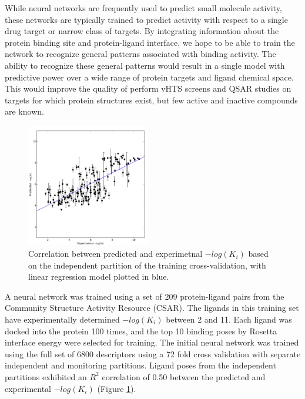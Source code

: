 \documentclass[11pt, oneside]{article}   	%
\begin{document}
While neural networks are frequently used to predict small molecule activity\citep{Hecht:2008gs, Mueller:2012gn, Gohlke:2002in}, these networks are typically trained to predict activity with respect to a single drug target or narrow class of targets.  
By integrating information about the protein binding site and protein-ligand interface, we hope to be able to train the network to recognize general patterns associated with binding activity.  
The ability to recognize these general patterns would result in a single model with predictive power over a wide range of protein targets and ligand chemical space.  
This would improve the quality of perform vHTS screens and QSAR studies on targets for which protein structures exist, but few active and inactive compounds are known. 
\begin{figure}
   \includegraphics[width=0.48\textwidth]{figures/crossval_correlation.pdf} %
   \caption{Correlation between predicted and experimetnal $-log(K_{i})$ based on the independent partition of the training cross-validation, with linear regression model plotted in blue. }
   \label{fig:crossval}
\end{figure}

A neural network was trained using a set of 209 protein-ligand pairs from the Community Structure Activity Resource (CSAR)\citep{Smith:2011gb}.  
The ligands in this training set have experimentally determined $-log(K_{i})$ between 2 and 11.  
Each ligand was docked into the protein 100 times, and the top 10 binding poses by Rosetta interface energy were selected for training. 
The initial neural network was trained using the full set of 6800 descriptors using a 72 fold cross validation with separate independent and monitoring partitions.  
Ligand poses from the independent partitions exhibited an $R^{2}$ correlation of 0.50 between the predicted and experimental $-log(K_{i})$ (Figure \ref{fig:crossval}).
\end{document}
